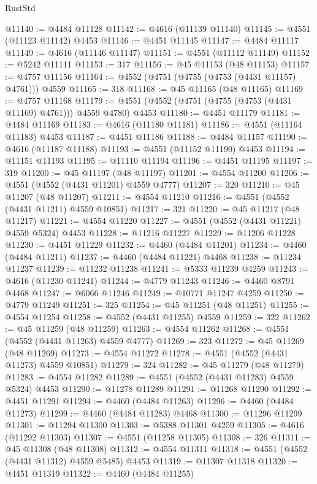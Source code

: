 \begin{lexlean}{RustStd}
\begin{coremodule}
@11140 := @4484 @11128
@11142 := @4616 (@11139 @11140)
@11145 := @4551 (@11123 @11142) @4453
@11146 := @4451 @11145
@11147 := @4484 @11117
@11149 := @4616 (@11146 @11147)
@11151 := @4551 (@11112 @11149)
@11152 := @5242 @11111
@11153 := 317
@11156 := @45 @11153 (@48 @11153)
@11157 := @4757 @11156
@11164 := @4552 (@4751 (@4755 (@4753 (@4431 @11157) @4761))) @4559
@11165 := 318
@11168 := @45 @11165 (@48 @11165)
@11169 := @4757 @11168
@11179 := @4551 (@4552 (@4751 (@4755 (@4753 (@4431 @11169) @4761))) @4559 @4780) @4453
@11180 := @4451 @11179
@11181 := @4484 @11169
@11183 := @4616 (@11180 @11181)
@11186 := @4551 (@11164 @11183) @4453
@11187 := @4451 @11186
@11188 := @4484 @11157
@11190 := @4616 (@11187 @11188)
@11193 := @4551 (@11152 @11190) @4453
@11194 := @11151 @11193
@11195 := @11110 @11194
@11196 := @4451 @11195
@11197 := 319
@11200 := @45 @11197 (@48 @11197)
@11201 := @4554 @11200
@11206 := @4551 (@4552 (@4431 @11201) @4559 @4777)
@11207 := 320
@11210 := @45 @11207 (@48 @11207)
@11211 := @4554 @11210
@11216 := @4551 (@4552 (@4431 @11211) @4559 @10851)
@11217 := 321
@11220 := @45 @11217 (@48 @11217)
@11221 := @4554 @11220
@11227 := @4551 (@4552 (@4431 @11221) @4559 @5324) @4453
@11228 := @11216 @11227
@11229 := @11206 @11228
@11230 := @4451 @11229
@11232 := @4460 (@4484 @11201)
@11234 := @4460 (@4484 @11211)
@11237 := @4460 (@4484 @11221) @4468
@11238 := @11234 @11237
@11239 := @11232 @11238
@11241 := @5333 @11239 @4259
@11243 := @4616 (@11230 @11241)
@11244 := @4779 @11243
@11246 := @4460 @8791 @4468
@11247 := @6066 @11246
@11249 := @10771 @11247 @4259
@11250 := @4779 @11249
@11251 := 325
@11254 := @45 @11251 (@48 @11251)
@11255 := @4554 @11254
@11258 := @4552 (@4431 @11255) @4559
@11259 := 322
@11262 := @45 @11259 (@48 @11259)
@11263 := @4554 @11262
@11268 := @4551 (@4552 (@4431 @11263) @4559 @4777)
@11269 := 323
@11272 := @45 @11269 (@48 @11269)
@11273 := @4554 @11272
@11278 := @4551 (@4552 (@4431 @11273) @4559 @10851)
@11279 := 324
@11282 := @45 @11279 (@48 @11279)
@11283 := @4554 @11282
@11289 := @4551 (@4552 (@4431 @11283) @4559 @5324) @4453
@11290 := @11278 @11289
@11291 := @11268 @11290
@11292 := @4451 @11291
@11294 := @4460 (@4484 @11263)
@11296 := @4460 (@4484 @11273)
@11299 := @4460 (@4484 @11283) @4468
@11300 := @11296 @11299
@11301 := @11294 @11300
@11303 := @5388 @11301 @4259
@11305 := @4616 (@11292 @11303)
@11307 := @4551 (@11258 @11305)
@11308 := 326
@11311 := @45 @11308 (@48 @11308)
@11312 := @4554 @11311
@11318 := @4551 (@4552 (@4431 @11312) @4559 @5485) @4453
@11319 := @11307 @11318
@11320 := @4451 @11319
@11322 := @4460 (@4484 @11255)

\end{coremodule}
\end{lexlean}

